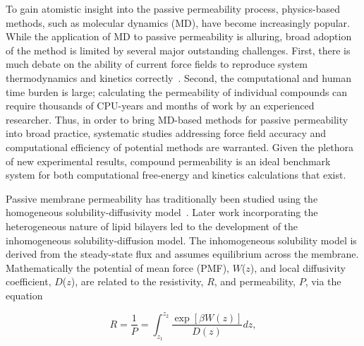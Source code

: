 \par To gain atomistic insight into the passive permeability process, physics-based methods, such as molecular dynamics (MD), have become increasingly popular. While the application of MD to passive permeability is alluring, broad adoption of the method is limited by several major outstanding challenges. First, there is much debate on the ability of current force fields to reproduce system thermodynamics and kinetics correctly~\cite{Paloncyova2014,Wang2015,Vitalini2015}. Second, the computational and human time burden is large; calculating the permeability of individual compounds can require thousands of CPU-years and months of work by an experienced researcher. Thus, in order to bring MD-based methods for passive permeability into broad practice, systematic studies addressing force field accuracy and computational efficiency of potential methods are warranted. Given the plethora of new experimental results, compound permeability is an ideal benchmark system for both computational free-energy and kinetics calculations that exist.

\par Passive membrane permeability has traditionally been studied using the homogeneous solubility-diffusivity model~\cite{Finkelstein1968}. Later work incorporating the heterogeneous nature of lipid bilayers led to the development of the inhomogeneous solubility-diffusion model\cite{Diamond1974,Marrink1994}. The inhomogeneous solubility model is derived from the steady-state flux and assumes equilibrium across the membrane. Mathematically the potential of mean force (PMF), $W$($z$), and local diffusivity coefficient, $D$($z$), are related to the resistivity, $R$, and permeability, $P$, via the equation

\begin{equation}
    R = \frac{1}{P} = \int_{z_1}^{z_2} \frac{\exp[\beta W(z)]}{D(z)}dz,
    \label{eq:solubility-diffusion}
\end{equation}

